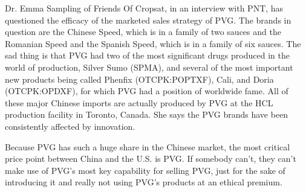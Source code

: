 \documentclass{article}
\begin{document}
Dr. Emma Sampling of Friends Of Cropsat, in an interview with PNT, has questioned the efficacy of the marketed sales strategy of PVG. The brands in question are the Chinese Speed, which is in a family of two sauces and the Romanian Speed and the Spanish Speed, which is in a family of six sauces. The sad thing is that PVG had two of the most significant drugs produced in the world of production, Silver Sumo (SPMA), and several of the most important new products being called Phenfix (OTCPK:POPTXF), Cali, and Doria (OTCPK:OPDXF), for which PVG had a position of worldwide fame. All of these major Chinese imports are actually produced by PVG at the HCL production facility in Toronto, Canada. She says the PVG brands have been consistently affected by innovation.

Because PVG has such a huge share in the Chinese market, the most critical price point between China and the U.S. is PVG. If somebody can’t, they can’t make use of PVG’s most key capability for selling PVG, just for the sake of introducing it and really not using PVG’s products at an ethical premium.
\end{document}
